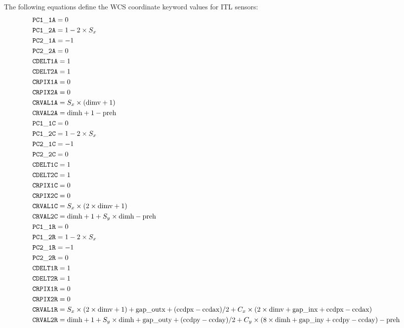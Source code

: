 \documentclass{article}[12pt]
\begin{document}
{The following equations define the WCS coordinate keyword values for ITL sensors:
\begin{align*}
& {\tt PC1\_1A} = 0 \\
& {\tt PC1\_2A} = 1 - 2 \times S_x \\
& {\tt PC2\_1A} = -1 \\
& {\tt PC2\_2A} = 0 \\
& {\tt CDELT1A} = 1 \\
& {\tt CDELT2A} = 1 \\
& {\tt CRPIX1A} = 0 \\
& {\tt CRPIX2A} = 0 \\
& {\tt CRVAL1A} = S_x \times({\rm dimv} + 1) \\
& {\tt CRVAL2A} = {\rm dimh} + 1 - {\rm preh} \\
& {\tt PC1\_1C} = 0 \\
& {\tt PC1\_2C} = 1 - 2 \times S_x \\
& {\tt PC2\_1C} = -1 \\
& {\tt PC2\_2C} = 0 \\
& {\tt CDELT1C} = 1 \\
& {\tt CDELT2C} = 1 \\
& {\tt CRPIX1C} = 0 \\
& {\tt CRPIX2C} = 0 \\
& {\tt CRVAL1C} = S_x \times(2 \times {\rm dimv} + 1) \\
& {\tt CRVAL2C} = {\rm dimh} + 1 + S_y \times {\rm dimh} - {\rm preh} \\
& {\tt PC1\_1R} = 0 \\
& {\tt PC1\_2R} = 1 - 2 \times S_x \\
& {\tt PC2\_1R} = -1 \\
& {\tt PC2\_2R} = 0 \\
& {\tt CDELT1R} = 1 \\
& {\tt CDELT2R} = 1 \\
& {\tt CRPIX1R} = 0 \\
& {\tt CRPIX2R} = 0 \\
& {\tt CRVAL1R} = S_x \times(2 \times {\rm dimv} + 1) + {\rm gap\_outx} + ({\rm ccdpx} - {\rm ccdax})/2 + C_x \times (2 \times {\rm dimv} + {\rm gap\_inx} + {\rm ccdpx} - {\rm ccdax}) \\
& {\tt CRVAL2R} = {\rm dimh} + 1 + S_y \times {\rm dimh} + {\rm gap\_outy} + ({\rm ccdpy} - {\rm ccday})/2 + C_y \times ( 8 \times {\rm dimh} + {\rm gap\_iny} + {\rm ccdpy} - {\rm ccday}) - {\rm preh} \\

\end{align*}}
\end{document}
